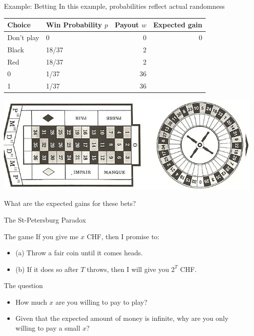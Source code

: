 \documentclass[smaller]{beamer}
\begin{document}
\begin{frame}[label={sec:org97206bf}]{Example: Betting}
In this example, probabilities reflect actual randomness

\begin{center}
\begin{tabular}{llrr}
\hline
Choice & Win Probability \(p\) & Payout \(w\) & Expected gain\\
\hline
Don't play & 0 & 0 & 0\\
Black & 18/37 & 2 & \\
Red & 18/37 & 2 & \\
0 & 1/37 & 36 & \\
1 & 1/37 & 36 & \\
\hline
\end{tabular}
\end{center}

\begin{center}
\includegraphics[width=.9\linewidth]{./figures/roulette.jpg}
\end{center}
What are the expected gains for these bets?
\end{frame}
\begin{frame}[label={sec:org768fc45}]{The St-Petersburg Paradox}
\begin{block}{The game}
If you give me \(x\) CHF, then I promise to:
\begin{itemize}
\item (a) Throw a fair coin until it comes heads.
\item (b) If it does so after \(T\) throws, then I will give you \(2^T\) CHF.
\end{itemize}
\end{block}
\begin{block}{The question}
\begin{itemize}
\item How much \(x\) are you willing to pay to play?
\item Given that the expected amount of money is infinite, why are you only willing to pay a small \(x\)?
\end{itemize}
\end{block}
\end{frame}
\end{document}
